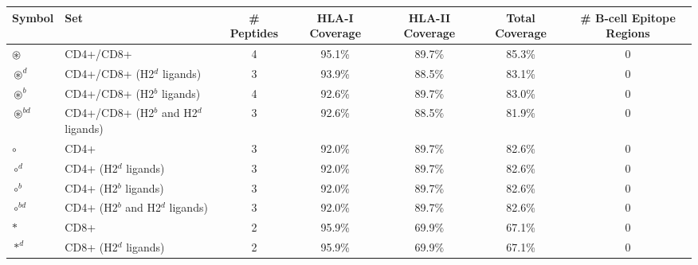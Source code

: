 \begin{tabular}{llccccc}
\toprule
                                              Symbol &                                      Set &  \# Peptides & HLA-I Coverage & HLA-II Coverage & Total Coverage &  \# B-cell Epitope Regions \\
\midrule
                                     $ \circledast $ &                                CD4+/CD8+ &            4 &         95.1\% &          89.7\% &         85.3\% &                          0 \\
                                   $ \circledast^d $ &               CD4+/CD8+ (H2$^d$ ligands) &            3 &         93.9\% &          88.5\% &         83.1\% &                          0 \\
                                   $ \circledast^b $ &               CD4+/CD8+ (H2$^b$ ligands) &            4 &         92.6\% &          89.7\% &         83.0\% &                          0 \\
                                $ \circledast^{bd} $ &    CD4+/CD8+ (H2$^b$ and H2$^d$ ligands) &            3 &         92.6\% &          88.5\% &         81.9\% &                          0 \\
                                           $ \circ $ &                                     CD4+ &            3 &         92.0\% &          89.7\% &         82.6\% &                          0 \\
                                         $ \circ^d $ &                    CD4+ (H2$^d$ ligands) &            3 &         92.0\% &          89.7\% &         82.6\% &                          0 \\
                                         $ \circ^b $ &                    CD4+ (H2$^b$ ligands) &            3 &         92.0\% &          89.7\% &         82.6\% &                          0 \\
                                      $ \circ^{bd} $ &         CD4+ (H2$^b$ and H2$^d$ ligands) &            3 &         92.0\% &          89.7\% &         82.6\% &                          0 \\
                                            $ \ast $ &                                     CD8+ &            2 &         95.9\% &          69.9\% &         67.1\% &                          0 \\
                                          $ \ast^d $ &                    CD8+ (H2$^d$ ligands) &            2 &         95.9\% &          69.9\% &         67.1\% &                          0 \\

\end{tabular}
